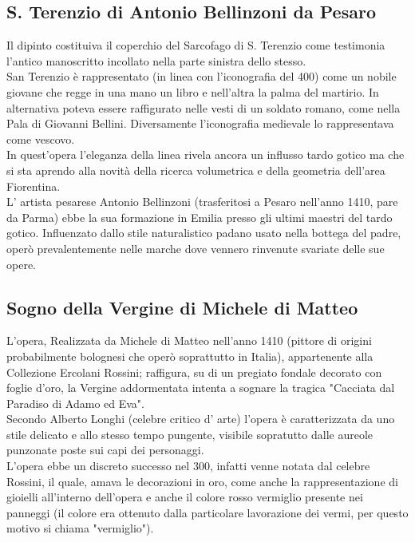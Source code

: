 \documentclass[12pt,a4paper]{article}
\begin{document}
	\subsection{S. Terenzio di Antonio Bellinzoni da Pesaro}
	Il dipinto costituiva il coperchio del Sarcofago di S. Terenzio come testimonia l’antico manoscritto incollato nella parte sinistra dello stesso.\\
	San Terenzio è rappresentato (in linea con l'iconografia del 400) come un nobile giovane che regge in una mano un libro e nell'altra la palma del martirio. In alternativa poteva essere raffigurato nelle vesti di un soldato romano, come nella Pala di Giovanni Bellini. Diversamente l’iconografia medievale lo rappresentava come vescovo.\\
	In quest'opera l'eleganza della linea rivela ancora un influsso tardo gotico ma che si sta aprendo alla novità della ricerca volumetrica e della geometria dell'area Fiorentina.\\
	L’ artista pesarese Antonio Bellinzoni (trasferitosi a Pesaro nell'anno 1410, pare da Parma) ebbe la sua formazione in Emilia presso gli ultimi maestri del tardo gotico. Influenzato dallo stile naturalistico padano usato nella bottega del padre, operò prevalentemente nelle marche dove vennero rinvenute svariate delle sue opere.
	
	\subsection{Sogno della Vergine di Michele di Matteo}
	L'opera, Realizzata da Michele di Matteo nell'anno 1410 (pittore di origini probabilmente bolognesi che operò soprattutto in Italia), appartenente alla Collezione Ercolani Rossini; raffigura, su di un pregiato fondale decorato con foglie d'oro, la Vergine addormentata intenta a sognare la tragica "Cacciata dal Paradiso di Adamo ed Eva".\\
	Secondo Alberto Longhi (celebre critico d’ arte) l'opera è caratterizzata da uno stile delicato e allo stesso tempo pungente, visibile sopratutto dalle aureole punzonate poste sui capi dei personaggi.\\
	L'opera ebbe un discreto successo nel 300, infatti venne notata dal celebre Rossini, il quale, amava le decorazioni in oro, come anche la rappresentazione di gioielli all'interno dell'opera e anche il colore rosso vermiglio presente nei panneggi (il colore era ottenuto dalla particolare lavorazione dei vermi, per questo motivo si chiama "vermiglio").  
	
\end{document}
